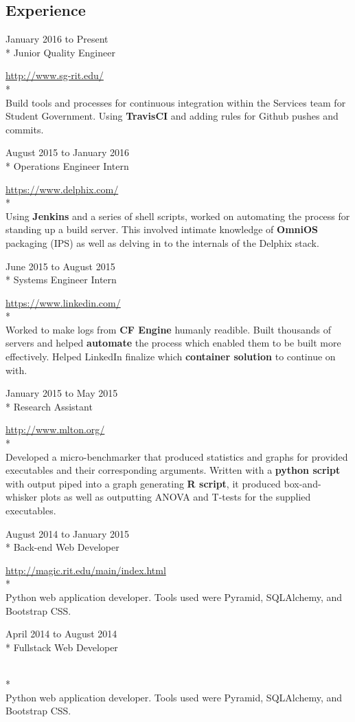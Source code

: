 \documentclass[a4paper,margin,line]{resume}
\newcommand{\rurl}[1]{\hfill {\footnotesize \url{#1}}}
\newcommand{\rdate}[1]{\hfill {\small #1}}
\newcommand{\rproject}[4]{\item[#1] \hfill \rdate{#2} \\* \hfill \rdate{#3} \strut\hfill \rurl{#4} \\*}
\begin{document}
\begin{resume}
\section{\mysidestyle Experience}
	\begin{asparadesc}
        \rproject{Student Government RIT}{January 2016 to Present}{Junior Quality Engineer}{http://www.sg-rit.edu/}
        \\
        \small
        Build tools and processes for continuous integration within the Services team
        for Student Government. Using {\bf TravisCI} and adding rules for Github pushes and
        commits.
        \normalsize
        \\
        \rproject{Delphix}{August 2015 to January 2016}{Operations Engineer Intern}{https://www.delphix.com/}
        \\
        \small
		Using {\bf Jenkins} and a series of shell scripts, worked on automating the process for standing up a build
		server. This involved intimate knowledge of {\bf OmniOS} packaging (IPS) as well as delving in to the internals
		of the Delphix stack.
        \normalsize
        \\
        \rproject{LinkedIn}{June 2015 to August 2015}{Systems Engineer Intern}{https://www.linkedin.com/}
        \\
        \small
        Worked to make logs from {\bf CF Engine} humanly readible. Built thousands of servers and helped {\bf automate}
        the process which enabled them to be built more effectively. Helped LinkedIn finalize which {\bf container 
        solution} to continue on with.
        \normalsize
        \\
        \rproject{Golisano College of Computing and Informational Sciences}{January 2015 to May 2015}{Research Assistant}{http://www.mlton.org/} 
        \\
        \small
        Developed a micro-benchmarker that produced statistics and graphs for provided executables
        and their corresponding arguments. Written with a {\bf python script} with output piped into
        a graph generating {\bf R script}, it produced box-and-whisker plots as well as outputting ANOVA and
        T-tests for the supplied executables.
        \normalsize
        \\
        \rproject{Media Arts Games Interaction and Creativity Center at RIT}{August 2014 to January 2015}{Back-end Web Developer}{http://magic.rit.edu/main/index.html}
		\small
        \\
        Python web application developer. Tools used were Pyramid, SQLAlchemy, and Bootstrap CSS.
        \\
        \rproject{Earth Moves}{April 2014 to August 2014}{Fullstack Web Developer}{}
        \\
		\small
        Python web application developer. Tools used were Pyramid, SQLAlchemy, and Bootstrap CSS.
    \end{asparadesc}

\end{resume}
\end{document}
